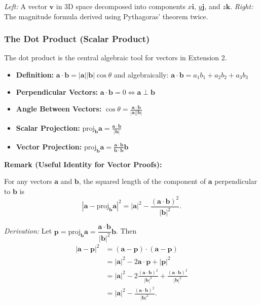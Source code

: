 \documentclass[12pt]{article}
\begin{document}
\vspace{0.5em}
\noindent\textit{Left:} A vector $\mathbf{v}$ in 3D space decomposed into components $x\mathbf{i}$, $y\mathbf{j}$, and $z\mathbf{k}$. 
\textit{Right:} The magnitude formula derived using Pythagoras' theorem twice.

\subsubsection{The Dot Product (Scalar Product)}
The dot product is the central algebraic tool for vectors in Extension 2.
\begin{itemize}[leftmargin=*]
  \item \textbf{Definition:} $\mathbf{a} \cdot \mathbf{b} = |\mathbf{a}||\mathbf{b}|\cos\theta$ and algebraically: $\mathbf{a} \cdot \mathbf{b} = a_1b_1 + a_2b_2 + a_3b_3$
  \item \textbf{Perpendicular Vectors:} $\mathbf{a} \cdot \mathbf{b} = 0 \Leftrightarrow \mathbf{a} \perp \mathbf{b}$
  \item \textbf{Angle Between Vectors:} $\cos\theta = \tfrac{\mathbf{a} \cdot \mathbf{b}}{|\mathbf{a}||\mathbf{b}|}$
  \item \textbf{Scalar Projection:} $\text{proj}_{\mathbf{b}}\mathbf{a} = \tfrac{\mathbf{a} \cdot \mathbf{b}}{|\mathbf{b}|}$
  \item \textbf{Vector Projection:} $\text{proj}_{\mathbf{b}}\mathbf{a} = \tfrac{\mathbf{a} \cdot \mathbf{b}}{\mathbf{b} \cdot \mathbf{b}}\mathbf{b}$
\end{itemize}

\vspace{0.3em}
\noindent\textbf{Remark (Useful Identity for Vector Proofs):}

For any vectors $\mathbf{a}$ and $\mathbf{b}$, the squared length of the component of $\mathbf{a}$ perpendicular to $\mathbf{b}$ is
\[
\left|\mathbf{a} - \text{proj}_{\mathbf{b}}\mathbf{a}\right|^2
= |\mathbf{a}|^2 - \frac{(\mathbf{a} \cdot \mathbf{b})^2}{|\mathbf{b}|^2}.
\]

\textit{Derivation:} Let $\mathbf{p} = \text{proj}_{\mathbf{b}}\mathbf{a} = \dfrac{\mathbf{a} \cdot \mathbf{b}}{|\mathbf{b}|^2}\mathbf{b}$. Then
\begin{align*}
\left|\mathbf{a} - \mathbf{p}\right|^2
&= (\mathbf{a} - \mathbf{p}) \cdot (\mathbf{a} - \mathbf{p}) \\
&= |\mathbf{a}|^2 - 2\mathbf{a} \cdot \mathbf{p} + |\mathbf{p}|^2 \\
&= |\mathbf{a}|^2 - 2\frac{(\mathbf{a} \cdot \mathbf{b})^2}{|\mathbf{b}|^2} + \frac{(\mathbf{a} \cdot \mathbf{b})^2}{|\mathbf{b}|^2} \\
&= |\mathbf{a}|^2 - \frac{(\mathbf{a} \cdot \mathbf{b})^2}{|\mathbf{b}|^2}.
\end{align*}
\end{document}
